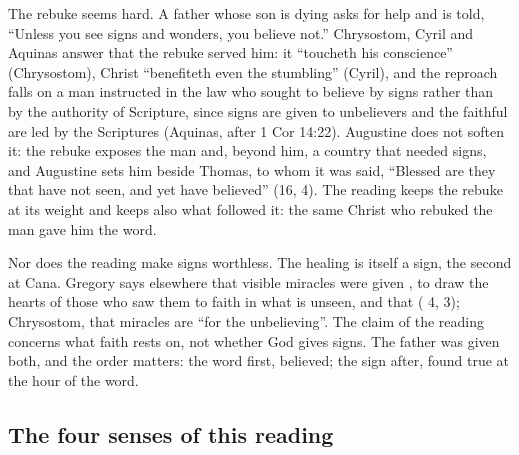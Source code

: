 The rebuke seems hard. A father whose son is dying asks for help and is told,
``Unless you see signs and wonders, you believe not.'' Chrysostom, Cyril and
Aquinas answer that the rebuke served him: it ``toucheth his conscience''
(Chrysostom), Christ ``benefiteth even the stumbling'' (Cyril), and the
reproach falls on a man instructed in the law who sought to believe by signs
rather than by the authority of Scripture, since signs are given to unbelievers
and the faithful are led by the Scriptures (Aquinas, after 1 Cor 14:22).
Augustine does not soften it: the rebuke exposes the man and, beyond him, a
country that needed signs, and Augustine sets him beside Thomas, to whom it was
said, ``Blessed are they that have not seen, and yet have believed'' (16, 4).
The reading keeps the rebuke at its weight and keeps also what followed it: the
same Christ who rebuked the man gave him the word.

Nor does the reading make signs worthless. The healing is itself a sign, the
second at Cana. Gregory says elsewhere that visible miracles were given
, to draw the hearts
of those who saw them to faith in what is unseen, and that  ( 4, 3);
Chrysostom, that miracles are ``for the unbelieving''. The claim of the reading
concerns what faith rests on, not whether God gives signs. The father was given
both, and the order matters: the word first, believed; the sign after, found
true at the hour of the word.

\subsection{The four senses of this reading}

